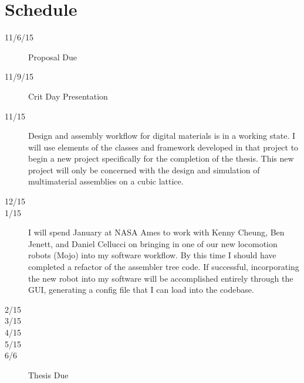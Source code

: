 {\section{Schedule}

\begin{description}
  \item[11/6/15]\tabto{1.5cm}Proposal Due
  \item[11/9/15]\tabto{1.5cm}Crit Day Presentation
  \item[11/15]\tabto{1.5cm}Design and assembly workflow for digital materials is in a working state.  I will use elements of the classes and framework developed in that project to begin a new project specifically for the completion of the thesis.  This new project will only be concerned with the design and simulation of multimaterial assemblies on a cubic lattice.
  \item[12/15]\tabto{1.5cm}
  \item[1/15]\tabto{1.5cm}I will spend January at NASA Ames to work with Kenny Cheung, Ben Jenett, and Daniel Cellucci on bringing in one of our new locomotion robots (Mojo) into my software workflow.  By this time I should have completed a refactor of the assembler tree code.  If successful, incorporating the new robot into my software will be accomplished entirely through the GUI, generating a config file that I can load into the codebase. 
  \item[2/15]\tabto{1.5cm}
  \item[3/15]\tabto{1.5cm}
  \item[4/15]\tabto{1.5cm}
  \item[5/15]\tabto{1.5cm}
  \item[6/6]\tabto{1.5cm}Thesis Due
\end{description}

}
